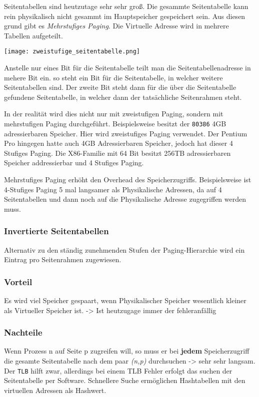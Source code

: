 Seitentabellen sind heutzutage sehr sehr groß. Die gesammte Seitentabelle kann
rein physikalisch nicht gesammt im Hauptspeicher gespeichert sein. Aus diesen
grund gibt es \textit{Mehrstufiges Paging}. Die Virtuelle Adresse wird in
mehrere Tabellen aufgeteilt.

\texttt{[image: zweistufige\_seitentabelle.png]}

Anstelle nur eines Bit für die Seitentabelle teilt man die
Seitentabellenadresse in mehere Bit ein. so steht ein Bit für die
Seitentabelle, in welcher weitere Seitentabellen sind. Der zweite Bit steht
dann für die über die Seitentabelle gefundene Seitentabelle, in welcher dann
der tatsächliche Seitenrahmen steht.

In der realität wird dies nicht nur mit zweistufigen Paging, sondern mit
mehrstufigen Paging durchgeführt. Beispielsweise besitzt der \texttt{80386} 4GB
adressierbaren Speicher. Hier wird zweistufiges Paging verwendet. Der Pentium
Pro hingegen hatte auch 4GB Adressierbaren Speicher, jedoch hat dieser 4
Stufiges Paging. Die X86-Familie mit 64 Bit besitzt 256TB adressierbaren
Speicher addressierbar und 4 Stufiges Paging.

Mehrstufiges Paging erhöht den Overhead des Speicherzugriffs. Beispielsweise
ist 4-Stufiges Paging 5 mal langsamer als Physikalische Adressen, da auf 4
Seitentabellen und dann noch auf die Physikalische Adresse zugegriffen werden
muss.

\subsubsection{Invertierte Seitentabellen}

Alternativ zu den ständig zunehmenden Stufen der Paging-Hierarchie wird ein
Eintrag pro Seitenrahmen zugewiesen.

\subsubsection*{Vorteil}

Es wird viel Speicher gespaart, wenn Physikalischer Speicher wesentlich kleiner
als Virtueller Speicher ist. -> Ist heutzugage immer der fehleranfällig

\subsubsection*{Nachteile}

Wenn Prozess n auf Seite p zugreifen will, so muss er bei \textbf{jedem}
Speicherzugriff die gesamte Seitentabelle nach dem paar \textit{(n,p)}
durchsuchen -> sehr sehr langsam. Der \texttt{TLB} hilft zwar, allerdings bei
einem TLB Fehler erfolgt das suchen der Seitentabelle per Software. Schnellere
Suche ermöglichen Hashtabellen mit den virtuellen Adressen als Hashwert.

